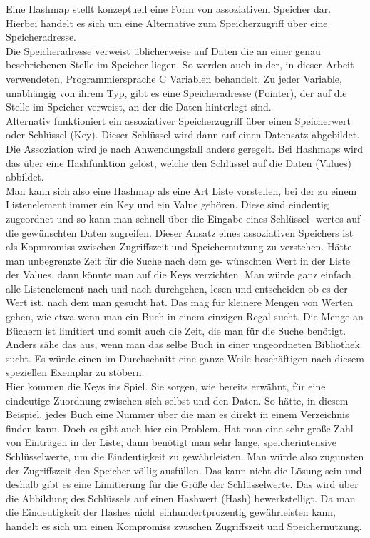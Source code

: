 \documentclass[11pt,a4paper]{article}
\begin{document}
Eine Hashmap stellt konzeptuell eine Form von assoziativem Speicher dar.
Hierbei handelt es sich um eine Alternative zum Speicherzugriff über eine Speicheradresse.\\
Die Speicheradresse verweist üblicherweise auf Daten die an einer genau
beschriebenen Stelle im Speicher liegen. So werden auch in der, in dieser Arbeit verwendeten, Programmiersprache C Variablen
behandelt. Zu jeder Variable, unabhängig von ihrem Typ, gibt es eine Speicheradresse (Pointer), der auf die Stelle im Speicher
verweist, an der die Daten hinterlegt sind.\\
Alternativ funktioniert ein assoziativer Speicherzugriff über einen Speicherwert oder Schlüssel (Key). Dieser Schlüssel wird 
dann auf einen Datensatz abgebildet. Die Assoziation wird je nach Anwendungsfall anders geregelt. Bei Hashmaps wird das über 
eine Hashfunktion gelöst, welche den Schlüssel auf die Daten (Values) abbildet.\\
Man kann sich also eine Hashmap als eine Art Liste vorstellen, bei der zu einem Listenelement immer ein Key und ein Value gehören.
Diese sind eindeutig zugeordnet und so kann man schnell über die Eingabe eines Schlüssel-
wertes auf die gewünschten Daten zugreifen.
Dieser Ansatz eines assoziativen Speichers ist als Kopmromiss zwischen Zugriffszeit und Speichernutzung zu verstehen.
Hätte man unbegrenzte Zeit für die Suche nach dem ge- 
wünschten Wert in der Liste der Values, dann könnte man auf die Keys verzichten.
Man würde ganz einfach alle Listenelement nach und nach durchgehen, lesen und entscheiden ob es der Wert ist, nach dem man gesucht hat.
Das mag für kleinere Mengen von Werten gehen, wie etwa wenn man ein Buch in einem einzigen Regal sucht. Die Menge an Büchern ist limitiert
und somit auch die Zeit, die man für die Suche benötigt. Anders sähe das aus, wenn man das selbe Buch in einer ungeordneten Bibliothek sucht.
Es würde einen im Durchschnitt eine ganze Weile beschäftigen nach diesem speziellen Exemplar zu stöbern.\\
Hier kommen die Keys ins Spiel. Sie sorgen, wie bereits erwähnt, für eine eindeutige Zuordnung zwischen sich selbst und den Daten.
So hätte, in diesem Beispiel, jedes Buch eine Nummer über die man es direkt in einem Verzeichnis finden kann.
Doch es gibt auch hier ein Problem. Hat man eine sehr große Zahl von Einträgen in der Liste, dann benötigt man sehr lange, speicherintensive 
Schlüsselwerte, um die Eindeutigkeit zu gewährleisten. Man würde also zugunsten der Zugriffszeit den Speicher völlig ausfüllen.
Das kann nicht die Lösung sein und deshalb gibt es eine Limitierung für die Größe der Schlüsselwerte. Das wird über die Abbildung des Schlüssels 
auf einen Hashwert (Hash) bewerkstelligt.
Da man die Eindeutigkeit der Hashes nicht einhundertprozentig gewährleisten kann, handelt es sich um einen Kompromiss zwischen Zugriffszeit und Speichernutzung.\\
\end{document}
